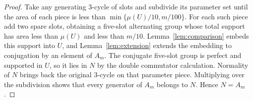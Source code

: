 \begin{proof}
Take any generating $3$-cycle of slots and subdivide its parameter
set until the area of each piece is less than
$\min\{\mu(U)/10,m/100\}$. For each such piece add two spare
slots, obtaining a five-slot alternating group whose total support
has area less than $\mu(U)$ and less than $m/10$.
Lemma~\ref{lem:comparison} embeds this support into $U$, and
Lemma~\ref{lem:extension} extends the embedding to conjugation by
an element of $A_m$. The conjugate five-slot group is perfect and
supported in $U$, so it lies in $N$ by the double commutator
calculation. Normality of $N$ brings back the original $3$-cycle
on that parameter piece. Multiplying over the subdivision shows
that every generator of $A_m$ belongs to $N$. Hence $N=A_m$.
\end{proof}

